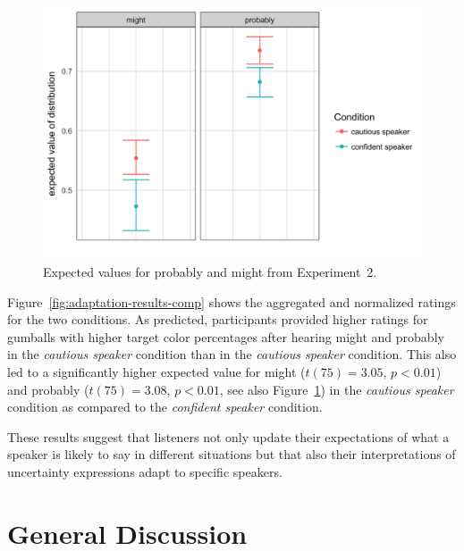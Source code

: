 \documentclass[lucida,biblatex]{sp} %
\begin{document}
\begin{figure}
\includegraphics[width=.75\textwidth]{plots/adaptation-diff-comprehension.png}
\caption{Expected values for {\sc probably} and {\sc might} from Experiment~2.  \label{fig:adaptation-exp-comp}}
\end{figure}


Figure~\ref{fig:adaptation-results-comp} shows the aggregated and normalized ratings for the two conditions.  As predicted, participants provided higher ratings for gumballs with higher target color percentages after hearing {\sc might} and {\sc probably} in the \emph{cautious speaker} condition than in the \emph{cautious speaker} condition. This also led to a significantly higher expected value for {\sc might} ($t(75)=3.05$, $p<0.01$) and {\sc probably} ($t(75)=3.08$, $p<0.01$, see also Figure~\ref{fig:adaptation-exp-comp}) in the \emph{cautious speaker} condition as compared to the \emph{confident speaker} condition.

These results suggest that listeners not only update their expectations of what a speaker is likely to say in different situations but that also their interpretations of uncertainty expressions adapt to specific speakers.


\section{General Discussion}
\end{document}
